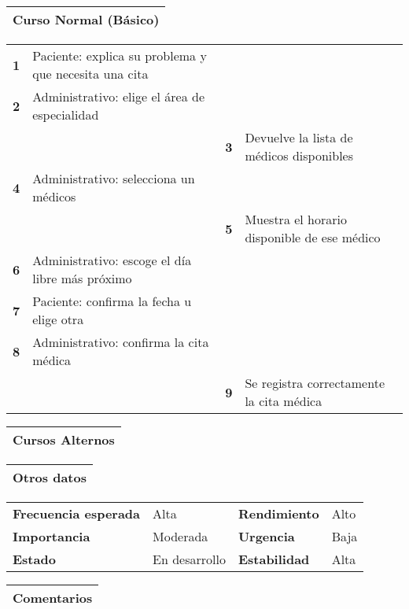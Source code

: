 \documentclass[11pt,a4paper]{article}
\begin{document}
\begin{table}[H]
	\begin{tabularx}{\textwidth}{X}
		\textbf{Curso Normal (Básico)}\\ \hline
	\end{tabularx}
	\begin{tabularx}{\textwidth}{cXcX}
		\textbf{1} & Paciente: explica su problema y que necesita una cita & & \\
		\textbf{2} & Administrativo: elige el área de  especialidad & & \\
		& & \textbf{3} & Devuelve la lista de médicos disponibles \\
		\textbf{4} & Administrativo: selecciona un médicos & & \\
		& & \textbf{5} & Muestra el horario disponible de ese médico \\
		\textbf{6} & Administrativo: escoge el día libre más próximo & & \\
		\textbf{7} & Paciente: confirma la fecha u elige otra & & \\
		\textbf{8} & Administrativo: confirma la cita médica & & \\
		& & \textbf{9} & Se registra correctamente la cita médica \\
	\end{tabularx}
	
	\begin{tabularx}{\textwidth}{X}
		\textbf{Cursos Alternos}\\ \hline
	\end{tabularx}
	
\end{table}

\begin{table}[H]
	\begin{tabularx}{\textwidth}{X}
		\textbf{Otros datos}\\ \hline
	\end{tabularx}

	\begin{tabularx}{\textwidth}{lXlX}
		\textbf{Frecuencia esperada} & Alta & \textbf{Rendimiento} & Alto\\
		\textbf{Importancia} & Moderada & \textbf{Urgencia} & Baja \\
		\textbf{Estado} & En desarrollo & \textbf{Estabilidad} & Alta\\
	\end{tabularx}
	
	\begin{tabularx}{\textwidth}{X}
		\textbf{Comentarios}\\ \hline
	\end{tabularx}
\end{table}
\end{document}
